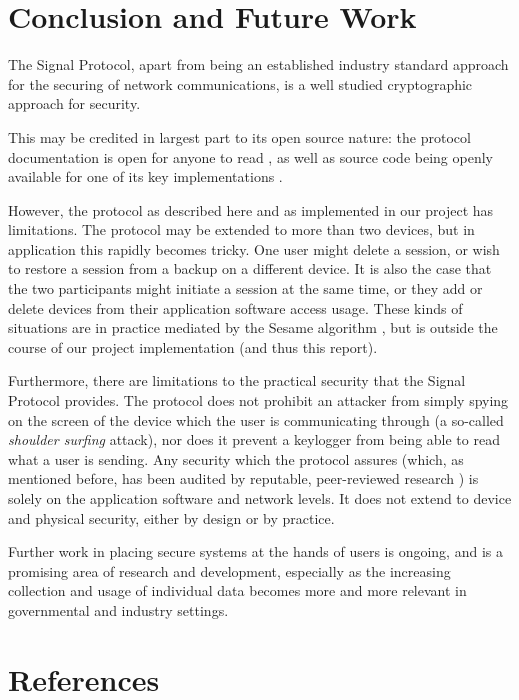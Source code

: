 \documentclass[12pt]{article}
\begin{document}
\section{Conclusion and Future Work}
The Signal Protocol, apart from being an established industry standard approach for the securing of network communications, is a well studied cryptographic approach for security. \parencite{formalAnalysisSig}\parencite{autoFormalAnalysisSig}
\par This may be credited in largest part to its open source nature: the protocol documentation is open for anyone to read \parencite{website:signal-docs}, as well as source code being openly available for one of its key implementations \parencite{website:sigOpenSource}. 
\par However, the protocol as described here and as implemented in our project has limitations. The protocol may be extended to more than two devices, but in application this rapidly becomes tricky. One user might delete a session, or wish to restore a session from a backup on a different device. It is also the case that the two participants might initiate a session at the same time, or they add or delete devices from their application software access usage. These kinds of situations are in practice mediated by the Sesame algorithm \parencite{website:sigSesame}, but is outside the course of our project implementation (and thus this report).
\par Furthermore, there are limitations to the practical security that the Signal Protocol provides. The protocol does not prohibit an attacker from simply spying on the screen of the device which the user is communicating through (a so-called \textit{shoulder surfing} attack), nor does it prevent a keylogger from being able to read what a user is sending. Any security which the protocol assures (which, as mentioned before, has been audited by reputable, peer-reviewed research \parencite{formalAnalysisSig}\parencite{autoFormalAnalysisSig}) is solely on the application software and network levels. It does not extend to device and physical security, either by design or by practice.
\par Further work in placing secure systems at the hands of users is ongoing, and is a promising area of research and development, especially as the increasing collection and usage of individual data becomes more and more relevant in governmental and industry settings.




\newpage
\section{References}
\printbibliography
\end{document}
